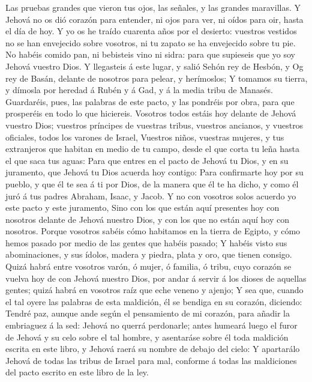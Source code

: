  Las pruebas grandes que vieron tus ojos, las señales, y las
grandes maravillas.  Y Jehová no os dió corazón para
entender, ni ojos para ver, ni oídos para oir, hasta el día de hoy.
 Y yo os he traído cuarenta años por el desierto: vuestros
vestidos no se han envejecido sobre vosotros, ni tu zapato se ha
envejecido sobre tu pie.  No habéis comido pan, ni bebisteis
vino ni sidra: para que supieseis que yo soy Jehová vuestro Dios.
 Y llegasteis á este lugar, y salió Sehón rey de Hesbón, y
Og rey de Basán, delante de nosotros para pelear, y herímoslos;
 Y tomamos su tierra, y dímosla por heredad á Rubén y á Gad,
y á la media tribu de Manasés.  Guardaréis, pues, las
palabras de este pacto, y las pondréis por obra, para que prosperéis en
todo lo que hiciereis.  Vosotros todos estáis hoy delante
de Jehová vuestro Dios; vuestros príncipes de vuestras tribus, vuestros
ancianos, y vuestros oficiales, todos los varones de Israel,
 Vuestros niños, vuestras mujeres, y tus extranjeros que
habitan en medio de tu campo, desde el que corta tu leña hasta el que
saca tus aguas:  Para que entres en el pacto de Jehová tu
Dios, y en su juramento, que Jehová tu Dios acuerda hoy contigo:
 Para confirmarte hoy por su pueblo, y que él te sea á ti
por Dios, de la manera que él te ha dicho, y como él juró á tus padres
Abraham, Isaac, y Jacob.  Y no con vosotros solos acuerdo
yo este pacto y este juramento,  Sino con los que están
aquí presentes hoy con nosotros delante de Jehová nuestro Dios, y con
los que no están aquí hoy con nosotros.  Porque vosotros
sabéis cómo habitamos en la tierra de Egipto, y cómo hemos pasado por
medio de las gentes que habéis pasado;  Y habéis visto sus
abominaciones, y sus ídolos, madera y piedra, plata y oro, que tienen
consigo.  Quizá habrá entre vosotros varón, ó mujer, ó
familia, ó tribu, cuyo corazón se vuelva hoy de con Jehová nuestro Dios,
por andar á servir á los dioses de aquellas gentes; quizá habrá en
vosotros raíz que eche veneno y ajenjo;  Y sea que, cuando
el tal oyere las palabras de esta maldición, él se bendiga en su
corazón, diciendo: Tendré paz, aunque ande según el pensamiento de mi
corazón, para añadir la embriaguez á la sed:  Jehová no
querrá perdonarle; antes humeará luego el furor de Jehová y su celo
sobre el tal hombre, y asentaráse sobre él toda maldición escrita en
este libro, y Jehová raerá su nombre de debajo del cielo: 
Y apartarálo Jehová de todas las tribus de Israel para mal, conforme á
todas las maldiciones del pacto escrito en este libro de la ley.

